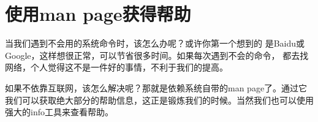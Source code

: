 \section{使用man page获得帮助}
\label{sec:getHelp}

当我们遇到不会用的系统命令时，该怎么办呢？或许你第一个想到的
是Baidu或Google，这样想很正常，可以节省很多时间。如果每次遇到不会的命令，
都去找网络，个人觉得这不是一件好的事情，不利于我们的提高。

如果不依靠互联网，该怎么解决呢？那就是依赖系统自带的man page了。通过它我们可以获取绝大部分的帮助信息，这正是锻炼我们的时候。当然我们也可以使用强大的info工具来查看帮助。
